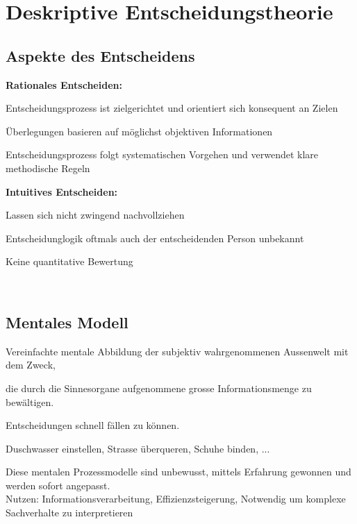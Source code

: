 \section{Deskriptive Entscheidungstheorie}
\subsection{Aspekte des Entscheidens}
\begin{multicols}{2}
	\textbf{Rationales Entscheiden:} 
	\begin{compactitem}
		\item Entscheidungsprozess ist zielgerichtet und orientiert sich konsequent an Zielen
		\item Überlegungen basieren auf möglichst objektiven Informationen
		\item Entscheidungsprozess folgt systematischen Vorgehen und verwendet klare methodische Regeln
	\end{compactitem}

	\textbf{Intuitives Entscheiden:} 
	\begin{compactitem}
		\item Lassen sich nicht zwingend nachvollziehen
		\item Entscheidunglogik oftmals auch der entscheidenden Person unbekannt
		\item Keine quantitative Bewertung
	\end{compactitem} \ \\
\end{multicols}

\subsection{Mentales Modell}
Vereinfachte mentale Abbildung der subjektiv wahrgenommenen Aussenwelt mit dem Zweck,
\begin{compactitem}
	\item die durch die Sinnesorgane aufgenommene grosse Informationsmenge zu bewältigen.
	\item Entscheidungen schnell fällen zu können.
\end{compactitem}
\begin{example}
	Duschwasser einstellen, Strasse überqueren, Schuhe binden, ...
\end{example}
Diese mentalen Prozessmodelle sind unbewusst, mittels Erfahrung gewonnen und werden sofort angepasst. \\
Nutzen: Informationsverarbeitung, Effizienzsteigerung, Notwendig um komplexe Sachverhalte zu interpretieren

